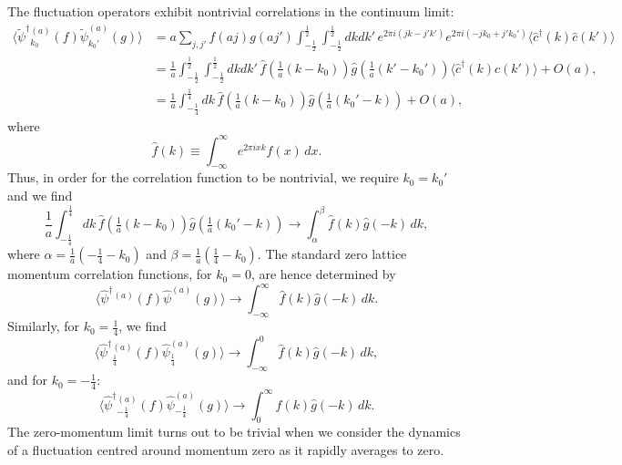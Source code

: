 \documentclass[prl,twocolumn,lengthcheck,superscriptaddress]{revtex4-1}
\theoremstyle{definition}
\theoremstyle{remark}
\begin{document}
The fluctuation operators exhibit nontrivial correlations in the continuum limit:
\begin{equation}
	\begin{split}
		\langle {\widetilde{\psi}^\dag}{}^{(a)}_{k_0}(f)\widetilde{\psi}^{(a)}_{k_0'}(g) \rangle &= a\sum_{j,j'}f(aj)g(aj')\int_{-\frac12}^{\frac12}\int_{-\frac12}^{\frac12} dkdk'\, e^{2\pi i (jk-j'k')}e^{2\pi i (-jk_0+j'k_0')} \langle \widehat{c}^\dag(k)\widehat{c}(k')\rangle \\
		&= \frac{1}{a}\int_{-\frac12}^{\frac12}\int_{-\frac12}^{\frac12} dkdk'\, \widehat{f}(\tfrac1a (k-k_0))\widehat{g}(\tfrac1a (k'-k_0')) \langle \widehat{c}^\dag(k)\widehat{c}(k')\rangle + O(a),\\
		&= \frac{1}{a}\int_{-\frac14}^{\frac14} dk\, \widehat{f}(\tfrac1a (k-k_0))\widehat{g}(\tfrac1a (k_0'-k)) + O(a),
	\end{split}
\end{equation}
where 
\begin{equation}
	\widehat{f}(k) \equiv \int_{-\infty}^\infty e^{2\pi i x k}f(x) \, dx.
\end{equation}
Thus, in order for the correlation function to be nontrivial, we require $k_0 = k_0'$ and we find
\begin{equation}
	\frac{1}{a}\int_{-\frac14}^{\frac14} dk\, \widehat{f}(\tfrac1a (k-k_0))\widehat{g}(\tfrac1a (k_0'-k)) \rightarrow \int_\alpha^{\beta} \widehat{f}(k)\widehat{g}(-k) \, dk,
\end{equation}
where $\alpha = \frac1a(-\frac14-k_0)$ and $\beta = \frac1a(\frac14-k_0)$. The standard zero lattice momentum correlation functions, for $k_0 = 0$, are hence determined by
\begin{equation}
	\langle {\widehat{\psi}^\dag}{}^{(a)}(f)\widehat{\psi}^{(a)}(g) \rangle \rightarrow \int_{-\infty}^{\infty} \widehat{f}(k)\widehat{g}(-k) \, dk.
\end{equation}
Similarly, for $k_0 = \frac14$, we find 
\begin{equation}
	\langle {\widehat{\psi}^\dag}{}^{(a)}_{\frac14}(f)\widehat{\psi}^{(a)}_{\frac14}(g) \rangle \rightarrow \int_{-\infty}^{0} \widehat{f}(k)\widehat{g}(-k) \, dk,
\end{equation}
and for $k_0 = -\frac14$:
\begin{equation}
	\langle {\widehat{\psi}^\dag}{}^{(a)}_{-\frac14}(f)\widehat{\psi}^{(a)}_{-\frac14}(g) \rangle \rightarrow \int_{0}^{\infty} \widehat{f}(k)\widehat{g}(-k) \, dk.
\end{equation}
The zero-momentum limit turns out to be trivial when we consider the dynamics of a fluctuation centred around momentum zero as it rapidly averages to zero.
\end{document}
